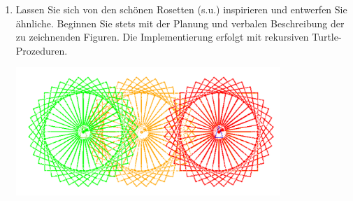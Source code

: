 \documentclass[12pt,a4paper]{scrartcl}
\begin{document}
\begin{enumerate}
\item Lassen Sie sich von den sch\"{o}nen Rosetten (s.u.) inspirieren und entwerfen Sie \"{a}hnliche. Beginnen Sie stets mit der Planung und verbalen Beschreibung der zu zeichnenden Figuren. Die Implementierung erfolgt mit rekursiven Turtle-Prozeduren.
\begin{center}
\includegraphics[width=100mm]{rosetten.pdf}
\end{center}

\end{enumerate}
\end{document}
